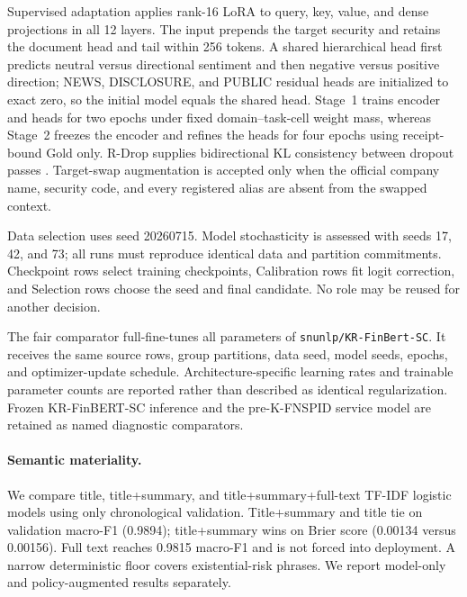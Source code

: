 \documentclass[11pt]{article}
\begin{document}
Supervised adaptation applies rank-16 LoRA to query, key, value, and dense projections in all 12 layers. The input prepends the target security and retains the document head and tail within 256 tokens. A shared hierarchical head first predicts neutral versus directional sentiment and then negative versus positive direction; NEWS, DISCLOSURE, and PUBLIC residual heads are initialized to exact zero, so the initial model equals the shared head. Stage~1 trains encoder and heads for two epochs under fixed domain--task-cell weight mass, whereas Stage~2 freezes the encoder and refines the heads for four epochs using receipt-bound Gold only. R-Drop supplies bidirectional KL consistency between dropout passes \citep{liang-etal-2021-rdrop}. Target-swap augmentation is accepted only when the official company name, security code, and every registered alias are absent from the swapped context.

Data selection uses seed 20260715. Model stochasticity is assessed with seeds 17, 42, and 73; all runs must reproduce identical data and partition commitments. Checkpoint rows select training checkpoints, Calibration rows fit logit correction, and Selection rows choose the seed and final candidate. No role may be reused for another decision.

The fair comparator full-fine-tunes all parameters of \texttt{snunlp/KR-FinBert-SC}. It receives the same source rows, group partitions, data seed, model seeds, epochs, and optimizer-update schedule. Architecture-specific learning rates and trainable parameter counts are reported rather than described as identical regularization. Frozen KR-FinBERT-SC inference and the pre-K-FNSPID service model are retained as named diagnostic comparators.

\paragraph{Semantic materiality.}
We compare title, title+summary, and title+summary+full-text TF-IDF logistic models using only chronological validation. Title+summary and title tie on validation macro-F1 (0.9894); title+summary wins on Brier score (0.00134 versus 0.00156). Full text reaches 0.9815 macro-F1 and is not forced into deployment. A narrow deterministic floor covers existential-risk phrases. We report model-only and policy-augmented results separately.
\end{document}
